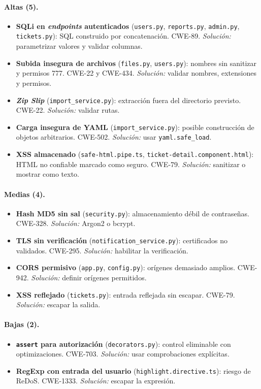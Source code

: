 \documentclass[11pt,letterpaper]{article}
\newcommand{\f}[1]{\texttt{#1}}
\begin{document}
\paragraph{Altas (5).}
\begin{itemize}
  \item \textbf{SQLi en \textit{endpoints} autenticados} (\f{users.py}, \f{reports.py}, \f{admin.py}, \f{tickets.py}): SQL construido por concatenación. CWE-89. \textit{Solución:} parametrizar valores y validar columnas.
  \item \textbf{Subida insegura de archivos} (\f{files.py}, \f{users.py}): nombres sin sanitizar y permisos 777. CWE-22 y CWE-434. \textit{Solución:} validar nombres, extensiones y permisos.
  \item \textbf{\textit{Zip Slip}} (\f{import\_service.py}): extracción fuera del directorio previsto. CWE-22. \textit{Solución:} validar rutas.
  \item \textbf{Carga insegura de YAML} (\f{import\_service.py}): posible construcción de objetos arbitrarios. CWE-502. \textit{Solución:} usar \f{yaml.safe\_load}.
  \item \textbf{XSS almacenado} (\f{safe-html.pipe.ts}, \f{ticket-detail.component.html}): HTML no confiable marcado como seguro. CWE-79. \textit{Solución:} sanitizar o mostrar como texto.
\end{itemize}

\paragraph{Medias (4).}
\begin{itemize}
  \item \textbf{Hash MD5 sin sal} (\f{security.py}): almacenamiento débil de contraseñas. CWE-328. \textit{Solución:} Argon2 o bcrypt.
  \item \textbf{TLS sin verificación} (\f{notification\_service.py}): certificados no validados. CWE-295. \textit{Solución:} habilitar la verificación.
  \item \textbf{CORS permisivo} (\f{app.py}, \f{config.py}): orígenes demasiado amplios. CWE-942. \textit{Solución:} definir orígenes permitidos.
  \item \textbf{XSS reflejado} (\f{tickets.py}): entrada reflejada sin escapar. CWE-79. \textit{Solución:} escapar la salida.
\end{itemize}

\paragraph{Bajas (2).}
\begin{itemize}
  \item \textbf{\f{assert} para autorización} (\f{decorators.py}): control eliminable con optimizaciones. CWE-703. \textit{Solución:} usar comprobaciones explícitas.
  \item \textbf{RegExp con entrada del usuario} (\f{highlight.directive.ts}): riesgo de ReDoS. CWE-1333. \textit{Solución:} escapar la expresión.
\end{itemize}
\end{document}
